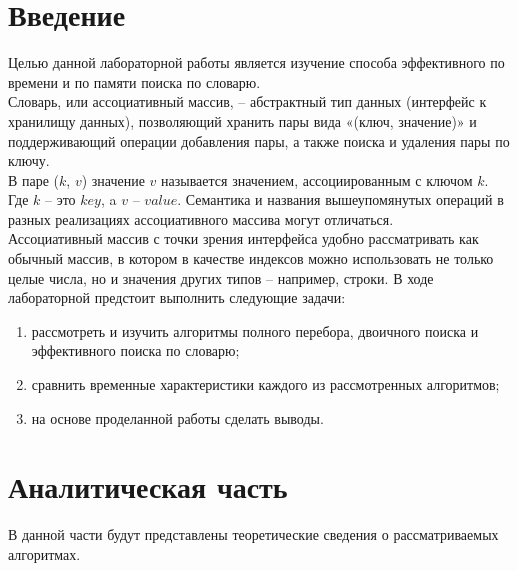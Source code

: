 \documentclass[a4paper, 12pt]{article}
\begin{document}
\tableofcontents
\clearpage
\newpage

\section*{Введение}


	\hspace*{5mm}Целью данной лабораторной работы является изучение способа эффективного по времени и по памяти поиска по словарю.
	\\ \hspace*{5mm} Словарь, или ассоциативный массив, – абстрактный тип данных (интерфейс к хранилищу данных), позволяющий хранить пары вида «(ключ, значение)» и поддерживающий операции добавления пары, а также поиска
	и удаления пары по ключу.\cite{dict}
	\\ \hspace*{5mm}В паре ($k$, $v$) значение $v$ называется значением, ассоциированным с ключом $k$. Где $k$ – это $key$, a $v$ – $value$. Семантика и названия вышеупомянутых операций в разных реализациях ассоциативного массива могут отличаться.
	\\ \hspace*{5mm}Ассоциативный массив с точки зрения интерфейса удобно рассматривать как обычный массив, в котором в качестве индексов можно использовать не только целые числа, но и значения других типов – например, строки. 
	\newline \hspace*{5mm} В ходе лабораторной предстоит выполнить следующие задачи: 
	\begin{enumerate}
		\item рассмотреть и изучить алгоритмы полного перебора, двоичного поиска и эффективного поиска по словарю;
		\item сравнить временные характеристики каждого из рассмотренных алгоритмов;
		\item на основе проделанной работы сделать выводы.
	\end{enumerate}
	
\clearpage
\newpage
\section{Аналитическая часть}
	\hspace*{5mm} В данной части будут представлены теоретические сведения о рассматриваемых алгоритмах.
\end{document}
